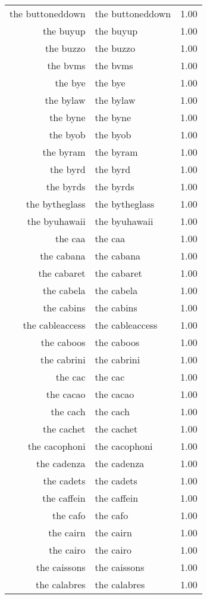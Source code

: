 \begin{table}[ht]
\begin{tabular}{rlr}
  the buttoneddown & the buttoneddown & 1.00 \\ 
  the buyup & the buyup & 1.00 \\ 
  the buzzo & the buzzo & 1.00 \\ 
  the bvms & the bvms & 1.00 \\ 
  the bye & the bye & 1.00 \\ 
  the bylaw & the bylaw & 1.00 \\ 
  the byne & the byne & 1.00 \\ 
  the byob & the byob & 1.00 \\ 
  the byram & the byram & 1.00 \\ 
  the byrd & the byrd & 1.00 \\ 
  the byrds & the byrds & 1.00 \\ 
  the bytheglass & the bytheglass & 1.00 \\ 
  the byuhawaii & the byuhawaii & 1.00 \\ 
  the caa & the caa & 1.00 \\ 
  the cabana & the cabana & 1.00 \\ 
  the cabaret & the cabaret & 1.00 \\ 
  the cabela & the cabela & 1.00 \\ 
  the cabins & the cabins & 1.00 \\ 
  the cableaccess & the cableaccess & 1.00 \\ 
  the caboos & the caboos & 1.00 \\ 
  the cabrini & the cabrini & 1.00 \\ 
  the cac & the cac & 1.00 \\ 
  the cacao & the cacao & 1.00 \\ 
  the cach & the cach & 1.00 \\ 
  the cachet & the cachet & 1.00 \\ 
  the cacophoni & the cacophoni & 1.00 \\ 
  the cadenza & the cadenza & 1.00 \\ 
  the cadets & the cadets & 1.00 \\ 
  the caffein & the caffein & 1.00 \\ 
  the cafo & the cafo & 1.00 \\ 
  the cairn & the cairn & 1.00 \\ 
  the cairo & the cairo & 1.00 \\ 
  the caissons & the caissons & 1.00 \\ 
  the calabres & the calabres & 1.00 \\ 

\end{tabular}
\end{table}
